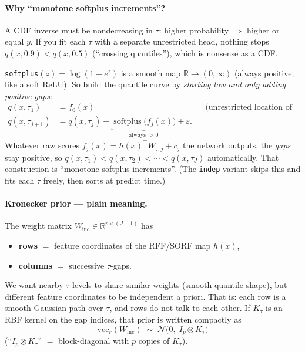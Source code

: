 \documentclass[11pt,a4paper]{article}
\theoremstyle{definition}
\newcommand{\R}{\mathbb{R}}
\newcommand{\Ncal}{\mathcal{N}}
\newcommand{\softplus}{\operatorname{softplus}}
\begin{document}
\paragraph{Why ``monotone softplus increments''?}
A CDF inverse must be nondecreasing in $\tau$: higher probability $\Rightarrow$
higher or equal $y$. If you fit each $\tau$ with a separate unrestricted head,
nothing stops
$q(x,0.9)<q(x,0.5)$ (``crossing quantiles''), which is nonsense as a CDF.

\texttt{softplus}$(z)=\log(1+e^{z})$ is a smooth map $\R\to(0,\infty)$
(always positive; like a soft $\mathrm{ReLU}$). So build the quantile curve
by \emph{starting low and only adding positive gaps}:
\begin{align}
  q(x,\tau_1)
  &=
  f_0(x)
  &&
  \text{(unrestricted location of the lowest knot),}
  \\
  q(x,\tau_{j+1})
  &=
  q(x,\tau_j)
  +
  \underbrace{\softplus\bigl(f_j(x)\bigr)}_{\text{always }>0}
  +\varepsilon.
\end{align}
Whatever raw scores $f_j(x)=h(x)^\top W_{:,j}+c_j$ the network outputs, the
\emph{gaps} stay positive, so
$q(x,\tau_1)<q(x,\tau_2)<\cdots<q(x,\tau_J)$ automatically.
That construction is ``monotone softplus increments''.
(The \texttt{indep} variant skips this and fits each $\tau$ freely, then sorts
at predict time.)

\paragraph{Kronecker prior --- plain meaning.}
The weight matrix $W_{\mathrm{inc}}\in\R^{p\times(J-1)}$ has
\begin{itemize}[leftmargin=1.2em,itemsep=0.1em]
  \item \textbf{rows} $=$ feature coordinates of the RFF/SORF map $h(x)$,
  \item \textbf{columns} $=$ successive $\tau$-gaps.
\end{itemize}
We want nearby $\tau$-levels to share similar weights (smooth quantile shape),
but different feature coordinates to be independent a priori. That is:
each row is a smooth Gaussian path over $\tau$, and rows do not talk to each
other. If $K_\tau$ is an RBF kernel on the gap indices, that prior is written
compactly as
\begin{equation}
  \mathrm{vec}_r(W_{\mathrm{inc}})
  \;\sim\;
  \Ncal\!\bigl(0,\; I_p\otimes K_\tau\bigr)
\end{equation}
(``$I_p\otimes K_\tau$'' $=$ block-diagonal with $p$ copies of $K_\tau$).
\end{document}

